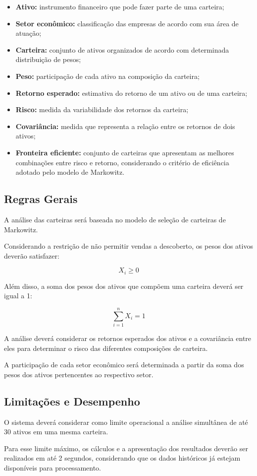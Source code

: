\begin{itemize}
    \item \textbf{Ativo:} instrumento financeiro que pode fazer
    parte de uma carteira;

    \item \textbf{Setor econômico:} classificação das empresas
    de acordo com sua área de atuação;

    \item \textbf{Carteira:} conjunto de ativos organizados
    de acordo com determinada distribuição de pesos;

    \item \textbf{Peso:} participação de cada ativo na
    composição da carteira;

    \item \textbf{Retorno esperado:} estimativa do retorno
    de um ativo ou de uma carteira;

    \item \textbf{Risco:} medida da variabilidade dos retornos
    da carteira;

    \item \textbf{Covariância:} medida que representa a relação
    entre os retornos de dois ativos;

    \item \textbf{Fronteira eficiente:} conjunto de carteiras
    que apresentam as melhores combinações entre risco e
    retorno, considerando o critério de eficiência adotado
    pelo modelo de Markowitz.
\end{itemize}

\subsection{Regras Gerais}

A análise das carteiras será baseada no modelo de seleção
de carteiras de Markowitz.

Considerando a restrição de não permitir vendas a descoberto,
os pesos dos ativos deverão satisfazer:

\[
X_i \geq 0
\]

Além disso, a soma dos pesos dos ativos que compõem uma
carteira deverá ser igual a 1:

\[
\sum_{i=1}^{n} X_i = 1
\]

A análise deverá considerar os retornos esperados dos ativos
e a covariância entre eles para determinar o risco das
diferentes composições de carteira.

A participação de cada setor econômico será determinada
a partir da soma dos pesos dos ativos pertencentes ao
respectivo setor.

\subsection{Limitações e Desempenho}

O sistema deverá considerar como limite operacional a análise
simultânea de até 30 ativos em uma mesma carteira.

Para esse limite máximo, os cálculos e a apresentação dos
resultados deverão ser realizados em até 2 segundos,
considerando que os dados históricos já estejam disponíveis
para processamento.

